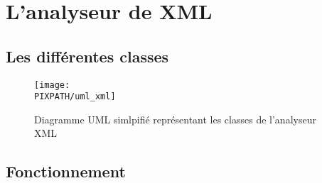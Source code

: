 \section{L'analyseur de XML}

    \subsection{Les différentes classes}
    
    \begin{center}
    \begin{figure}[h]
        \texttt{[image: \\PIXPATH/uml\_xml]}
        \caption{Diagramme UML simlpifié représentant les classes de l'analyseur XML}
    \end{figure}
    \end{center}

    \subsection{Fonctionnement}


